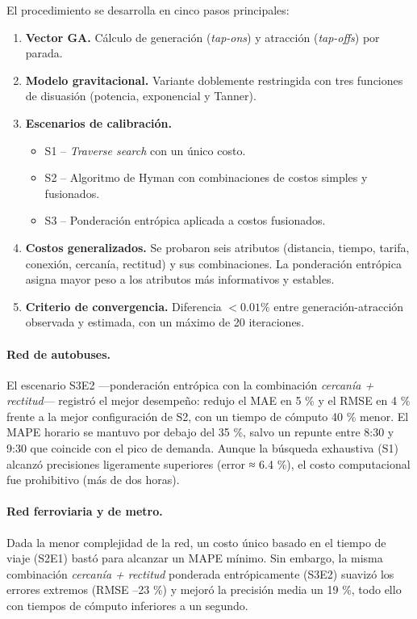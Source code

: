 \documentclass[11pt]{article}
\begin{document}
		El procedimiento se desarrolla en cinco pasos principales:
		\begin{enumerate}
		  \item \textbf{Vector GA.} Cálculo de generación (\textit{tap-ons}) y atracción (\textit{tap-offs}) por parada.
		  \item \textbf{Modelo gravitacional.} Variante doblemente restringida con tres funciones de disuasión (potencia, exponencial y Tanner).
		  \item \textbf{Escenarios de calibración.}
				\begin{itemize}
				  \item S1 – \emph{Traverse search} con un único costo.
				  \item S2 – Algoritmo de Hyman con combinaciones de costos simples y fusionados.
				  \item S3 – Ponderación entrópica aplicada a costos fusionados.
				\end{itemize}
		  \item \textbf{Costos generalizados.} Se probaron seis atributos (distancia, tiempo, tarifa, conexión, cercanía, rectitud) y sus combinaciones. La ponderación entrópica asigna mayor peso a los atributos más informativos y estables.
		  \item \textbf{Criterio de convergencia.} Diferencia $<0.01\%$ entre generación-atracción observada y estimada, con un máximo de 20 iteraciones.
		\end{enumerate}

		\paragraph{Red de autobuses.}
		El escenario S3E2 —ponderación entrópica con la combinación \emph{cercanía + rectitud}— registró el mejor desempeño: redujo el MAE en 5 \% y el RMSE en 4 \% frente a la mejor configuración de S2, con un tiempo de cómputo 40 \% menor. El MAPE horario se mantuvo por debajo del 35 \%, salvo un repunte entre 8:30 y 9:30 que coincide con el pico de demanda. Aunque la búsqueda exhaustiva (S1) alcanzó precisiones ligeramente superiores (error ≈ 6.4 \%), el costo computacional fue prohibitivo (más de dos horas).

		\paragraph{Red ferroviaria y de metro.}
		Dada la menor complejidad de la red, un costo único basado en el tiempo de viaje (S2E1) bastó para alcanzar un MAPE mínimo. Sin embargo, la misma combinación \emph{cercanía + rectitud} ponderada entrópicamente (S3E2) suavizó los errores extremos (RMSE –23 \%) y mejoró la precisión media un 19 \%, todo ello con tiempos de cómputo inferiores a un segundo.
\end{document}
